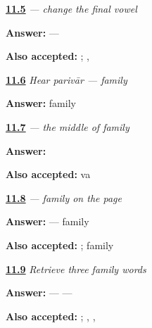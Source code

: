 \noindent\begin{minipage}[t]{\linewidth}
\raggedright
\hyperlink{review-MW-C08-dadi-grandparent-pair}{\textbf{11.5}} \emph{ — change the final vowel}\par
\small \textbf{Answer:}  — \par
\footnotesize \textbf{Also accepted:}  ; , 
\end{minipage}\par\medskip

\noindent\begin{minipage}[t]{\linewidth}
\raggedright
\hyperlink{review-MW-C08-hear-parivaar-meaning}{\textbf{11.6}} \emph{Hear \emph{parivār} — family}\par
\small \textbf{Answer:} family\par
\end{minipage}\par\medskip

\noindent\begin{minipage}[t]{\linewidth}
\raggedright
\hyperlink{review-MW-W08-va-write}{\textbf{11.7}} \emph{ — the middle of family}\par
\small \textbf{Answer:} \par
\footnotesize \textbf{Also accepted:}  va
\end{minipage}\par\medskip

\noindent\begin{minipage}[t]{\linewidth}
\raggedright
\hyperlink{review-MW-C08-parivaar-dictation}{\textbf{11.8}} \emph{ — family on the page}\par
\small \textbf{Answer:}  — family\par
\footnotesize \textbf{Also accepted:} ;  family
\end{minipage}\par\medskip

\noindent\begin{minipage}[t]{\linewidth}
\raggedright
\hyperlink{review-MW-R08-family-foundation-three}{\textbf{11.9}} \emph{Retrieve three family words}\par
\small \textbf{Answer:}  —  — \par
\footnotesize \textbf{Also accepted:}   ; , , 
\end{minipage}\par\medskip


